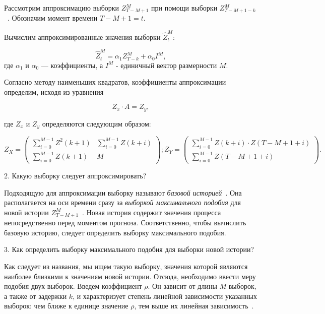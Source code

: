 Рассмотрим аппроксимацию выборки \newline $Z_{T-M+1}^M$ при помощи выборки $Z_{T-M+1-k}^M$~\cite{myref9}.
Обозначим момент времени $T-M+1=t$.

Вычислим аппроксимированные значения выборки $\widehat{Z}_t^M$:

\begin{equation}
    \widehat{Z}_t^M = \alpha_1Z_{T-k}^M+\alpha_0I^M,
\end{equation}
где $\alpha_1$ и $\alpha_0$ --- коэффициенты,
а $I^M$ - единичный вектор размерности $M$.

Согласно методу наименьших квадратов, коэффициенты аппроксимации определим, исходя из уравнения

\begin{equation}
    Z_x \cdot A = Z_y,
\end{equation}

где $Z_x$ и $Z_y$ определяются следующим образом:
\begin{flushright}
\begin{equation}
    Z_X =
\begin{pmatrix}
           \sum_{i=0}^{M-1} Z^2(k+1) & \sum_{i=0}^{M-1} Z(k+i) \\
           \sum_{i=0}^{M-1} Z(k+1)   & M
\end{pmatrix};

    Z_Y =
    \begin{pmatrix}
               \sum_{i=0}^{M-1} Z(k+i) \cdot Z(T-M+1+i) \\
               \sum_{i=0}^{M-1} Z(T-M+1+i)
\end{pmatrix}.{\qquad\qquad }
    \label{eq:equation}
\end{equation}
\end{flushright}

2. Какую выборку следует аппроксимировать?

Подходящую для аппроксимации выборку называют \textit{базовой историей}~\cite{myref9}.
Она располагается на оси времени сразу за \textit{выборкой максимального подобия} для новой истории $Z_{T-M+1}^M$~\cite{myref9}.
Новая история содержит значения процесса непосредственно перед моментом прогноза.
Соответственно, чтобы вычислить базовую историю, следует определить выборку максимального подобия.

3. Как определить выборку максимального подобия для выборки новой истории?

Как следует из названия, мы ищем такую выборку, значения которой являются наиболее близкими к значениям новой истории.
Отсюда, необходимо ввести меру подобия двух выборок.
Введем коэффициент $\rho$.
Он зависит от длины $M$ выборок, а также от задержки $k$, и характеризует степень линейной зависимости указанных выборок:
чем ближе к единице значение $\rho$, тем выше их линейная зависимость~\cite{myref9, myref11}.

